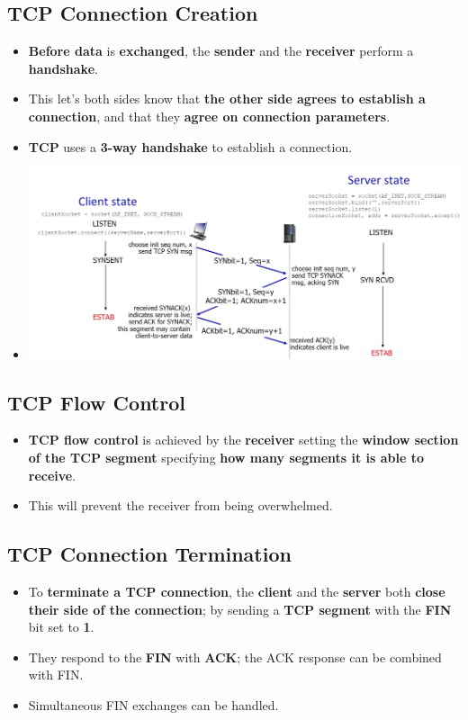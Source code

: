 \documentclass{article}
\begin{document}
    \subsection*{TCP Connection Creation}
    \begin{itemize}
        \item \textbf{Before data} is \textbf{exchanged}, the \textbf{sender} and the \textbf{receiver} perform a \textbf{handshake}.
        \item This let's both sides know that \textbf{the other side agrees to establish a connection}, and that they \textbf{agree on connection parameters}.
        \item \textbf{TCP} uses a \textbf{3-way handshake} to establish a connection.
        \item[] \includegraphics*[width=\textwidth - 25pt]{images/TCPHandShake.PNG}
    \end{itemize}

    \subsection*{TCP Flow Control}
    \begin{itemize}
        \item \textbf{TCP flow control} is achieved by the \textbf{receiver} setting the \textbf{window section of the TCP segment} specifying \textbf{how many segments it is able to receive}.
        \item This will prevent the receiver from being overwhelmed.
    \end{itemize}

    \subsection*{TCP Connection Termination}
    \begin{itemize}
        \item To \textbf{terminate a TCP connection}, the \textbf{client} and the \textbf{server} both \textbf{close their side of the connection}; by sending a \textbf{TCP segment} with the \textbf{FIN} bit set to \textbf{1}.
        \item They respond to the \textbf{FIN} with \textbf{ACK}; the ACK response can be combined with FIN.
        \item Simultaneous FIN exchanges can be handled.
    \end{itemize}
\end{document}
